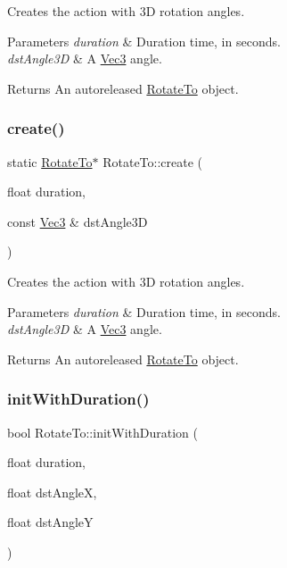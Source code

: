 Creates the action with 3D rotation angles. 
\begin{DoxyParams}{Parameters}
{\em duration} & Duration time, in seconds. \\
\hline
{\em dst\+Angle3D} & A \hyperlink{classVec3}{Vec3} angle. \\
\hline
\end{DoxyParams}
\begin{DoxyReturn}{Returns}
An autoreleased \hyperlink{classRotateTo}{Rotate\+To} object. 
\end{DoxyReturn}
\mbox{\label{classRotateTo_af4cf52ca1ddc34b8df22d1614554df37}} 
\subsubsection{\texorpdfstring{create()}{create()}\hspace{0.1cm}{\footnotesize\ttfamily [6/6]}}
{\footnotesize\ttfamily static \hyperlink{classRotateTo}{Rotate\+To}$\ast$ Rotate\+To\+::create (\begin{DoxyParamCaption}\item[{float}]{duration,  }\item[{const \hyperlink{classVec3}{Vec3} \&}]{dst\+Angle3D }\end{DoxyParamCaption})\hspace{0.3cm}{\ttfamily [static]}}

Creates the action with 3D rotation angles. 
\begin{DoxyParams}{Parameters}
{\em duration} & Duration time, in seconds. \\
\hline
{\em dst\+Angle3D} & A \hyperlink{classVec3}{Vec3} angle. \\
\hline
\end{DoxyParams}
\begin{DoxyReturn}{Returns}
An autoreleased \hyperlink{classRotateTo}{Rotate\+To} object. 
\end{DoxyReturn}
\mbox{\label{classRotateTo_af37750b148cb71442b29888f3dafd9a8}} 
\subsubsection{\texorpdfstring{init\+With\+Duration()}{initWithDuration()}\hspace{0.1cm}{\footnotesize\ttfamily [1/4]}}
{\footnotesize\ttfamily bool Rotate\+To\+::init\+With\+Duration (\begin{DoxyParamCaption}\item[{float}]{duration,  }\item[{float}]{dst\+AngleX,  }\item[{float}]{dst\+AngleY }\end{DoxyParamCaption})}


